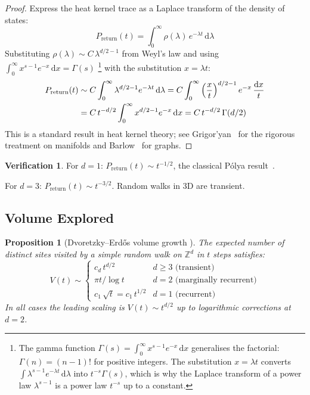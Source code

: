 \documentclass[11pt,a4paper]{article}
\newtheorem{proposition}[theorem]{Proposition}
\theoremstyle{definition}
\newtheorem*{verification}{Verification}
\newcommand{\dd}{\mathrm{d}}
\newcommand{\Preturn}{P_{\mathrm{return}}}
\begin{document}
\begin{proof}
Express the heat kernel trace as a Laplace transform of the density
of states:
\[
\Preturn(t) = \int_0^\infty \rho(\lambda)\, e^{-\lambda t}\, \dd\lambda
\]
Substituting $\rho(\lambda) \sim C\,\lambda^{d/2-1}$ from Weyl's law
and using $\int_0^\infty x^{s-1} e^{-x}\,\dd x = \Gamma(s)$%
\footnote{The gamma function $\Gamma(s) = \int_0^\infty x^{s-1}e^{-x}\,\dd x$
generalises the factorial: $\Gamma(n) = (n{-}1)!$ for positive integers.
The substitution $x = \lambda t$ converts $\int \lambda^{s-1}e^{-\lambda t}\,\dd\lambda$
into $t^{-s}\Gamma(s)$, which is why the Laplace transform of a power law
$\lambda^{s-1}$ is a power law $t^{-s}$ up to a constant.}
with the substitution $x = \lambda t$:
\begin{align}
\Preturn(t) &\sim C \int_0^\infty \lambda^{d/2-1} e^{-\lambda t}\, \dd\lambda
= C \int_0^\infty \left(\frac{x}{t}\right)^{d/2-1} e^{-x}\, \frac{\dd x}{t} \notag \\
&= C\, t^{-d/2} \int_0^\infty x^{d/2-1} e^{-x}\,\dd x
= C\, t^{-d/2}\, \Gamma(d/2)
\end{align}
This is a standard result in heat kernel theory;
see Grigor'yan~\cite{grigoryan2009} for the rigorous treatment on
manifolds and Barlow~\cite{barlow1998} for graphs.
\end{proof}

\begin{verification}
For $d = 1$: $\Preturn(t) \sim t^{-1/2}$, the classical P\'{o}lya
result~\cite{polya1921}. \checkmark

For $d = 3$: $\Preturn(t) \sim t^{-3/2}$. Random walks in 3D are
transient. \checkmark
\end{verification}

\subsection{Volume Explored}

\begin{proposition}[Dvoretzky--Erd\H{o}s volume growth {\cite{dvoretzky1951,legall2005}}]
\label{prop:volume}
The expected number of distinct sites visited by a simple random walk
on $\mathbb{Z}^d$ in $t$ steps satisfies:
\begin{equation}
V(t) \sim \begin{cases}
c_d\, t^{d/2} & d \geq 3 \text{ (transient)} \\[4pt]
\pi t / \log t & d = 2 \text{ (marginally recurrent)} \\[4pt]
c_1\, \sqrt{t} = c_1\, t^{1/2} & d = 1 \text{ (recurrent)}
\end{cases}
\label{eq:volume}
\end{equation}
In all cases the leading scaling is $V(t) \sim t^{d/2}$ up to logarithmic
corrections at $d = 2$.
\end{proposition}
\end{document}
